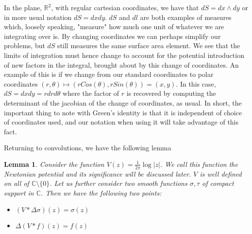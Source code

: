 \documentclass[11pt]{report}
\newtheorem{lemma}[thm]{Lemma}
\theoremstyle{definition}
\begin{document}
In the plane, $\mathbb{R}^2$, with regular cartesian coordinates, we have that $dS = dx \wedge dy$ or in more usual notation $dS = dxdy$. $dS$ and $dl$ are both examples of measures which, loosely speaking, "measure" how much one unit of whatever we are integrating over is.
By changing coordinates we can perhaps simplify our problems, but $dS$ still measures the same surface area element. We see that the limits of integration must hence change to account for the potential introduction of new factors in the integral, brought about by this change of coordinates. An example of this is if we change from our standard coordinates to polar coordinates $(r,\theta) \mapsto (rCos(\theta),rSin(\theta)) = (x,y)$. In this case, $dS=dxdy=rdrd\theta$ where the factor of $r$ is recovered by computing the determinant of the jacobian of the change of coordinates, as usual. In short, the important thing to note with Green's identity is that it is independent of choice of coordinates used, and our notation when using it will take advantage of this fact.

Returning to convolutions, we have the following lemma
\begin{lemma}\label{ConvProperties}
  Consider the function $V(z) = \frac{1}{2\pi}\log|z|$. We call this function the Newtonian potential and its significance will be discussed later. $V$ is well defined on all of $\mathbb{C}\setminus\{0\}$. Let us further consider two smooth functions $\sigma, \tau$ of compact support in $\mathbb{C}$. Then we have the following two points:
  \begin{itemize}
    \item $(V * \Delta \sigma)(z)=\sigma(z)$
    \item $\Delta(V * f)(z) = f(z)$
  \end{itemize}
\end{lemma}
\end{document}
